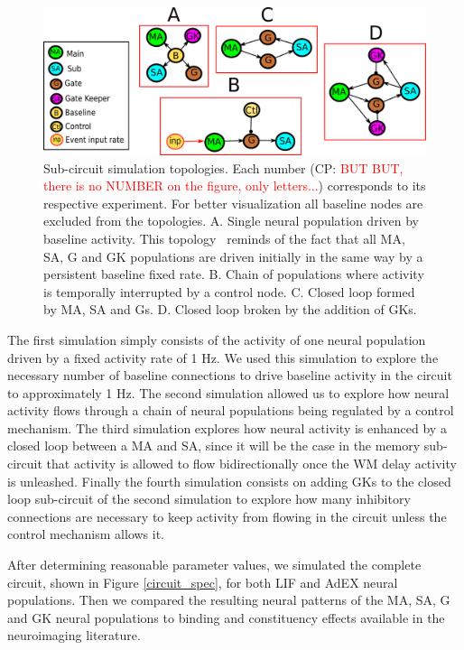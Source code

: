 \documentclass[10pt]{article}
\newcommand{\noteCP}[1]{(CP: \textcolor{red}{#1})}
\begin{document}
\begin{figure}[h!]
  \begin{center}
    \includegraphics[width=0.70\columnwidth]{figures/sub_circuits3/sub_circuits3}
    \caption{Sub-circuit simulation topologies.
      Each number \noteCP{BUT BUT, there is  no NUMBER on the figure, only letters...} corresponds to its respective experiment.
      For better visualization all baseline nodes are excluded from the topologies.
      A. Single neural population driven by baseline activity.
      This topology~ reminds of the fact that all MA, SA, G and GK populations are driven initially in the same way by a persistent baseline fixed rate.
      B. Chain of populations where activity is temporally interrupted by a control node.
      C. Closed loop formed by MA, SA and Gs.
      D. Closed loop broken by the addition of GKs. {\label{sub_circuits}}%
    }
  \end{center}
\end{figure}

The first simulation simply consists of the activity of one neural population driven by a fixed activity rate of 1 Hz.
We used this simulation to explore the necessary number of baseline connections to drive baseline activity in the circuit to approximately 1 Hz.
The second simulation allowed us to explore how neural activity flows through a chain of neural populations being regulated by a control mechanism.
The third simulation explores how neural activity is enhanced by a closed loop between a MA and SA, since it will be the case in the memory sub-circuit that activity is allowed to flow bidirectionally once the WM delay activity is unleashed.
Finally the fourth simulation consists on adding GKs to the closed loop sub-circuit of the second simulation to explore how many inhibitory connections are necessary to keep activity from flowing in the circuit unless the control mechanism allows it.

After determining reasonable parameter values, we simulated the complete circuit, shown in Figure \ref{circuit_spec}, for both LIF and AdEX neural populations.
Then we compared the resulting neural patterns of the MA, SA, G and GK neural populations to binding and constituency effects available in the neuroimaging literature.
\end{document}
